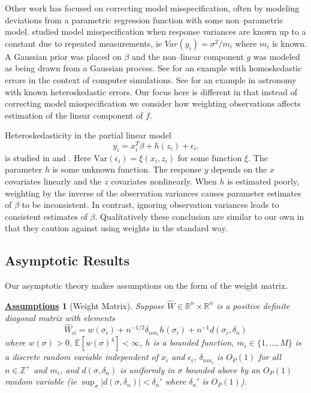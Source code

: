\documentclass[ejs,ps,preprint]{imsart}
\numberwithin{equation}{section}
\theoremstyle{plain}
\newcommand{\Var}{\text{Var}}
\newcommand{\E}{\mathbb{E}}
\newtheorem{Assume}{\underline{\bf Assumptions}}
\def\E{\mathbb{E}}
\begin{document}
Other work has focused on correcting model misspecification, often by modeling deviations from a parametric regression function with some non--parametric model. \cite{blight1975bayesian} studied model misspecification when response variances are known up to a constant due to repeated measurements, ie $Var(y_i) = \sigma^2/m_i$ where $m_i$ is known. A Gaussian prior was placed on $\beta$ and the non--linear component $g$ was modeled as being drawn from a Gaussian process. See \cite{kennedy2001bayesian} for an example with homoskedastic errors in the context of computer simulations. See \cite{czekala2015constructing} for an example in astronomy with known heteroskedastic errors. Our focus here is different in that instead of correcting model misspecification we consider how weighting observations affects estimation of the linear component of $f$. 

Heteroskedasticity in the partial linear model
\begin{equation*}
y_i = x_i^T\beta + h(z_i) + \epsilon_i.
\end{equation*}
is studied in \cite{ma2006efficient} and \cite{ma2013doubly}. Here $\Var(\epsilon_i) = \xi(x_i,z_i)$ for some function $\xi$. The parameter $h$ is some unknown function. The response $y$ depends on the $x$ covariates linearly and the $z$ covariates nonlinearly. When $h$ is estimated poorly, weighting by the inverse of the observation variances causes parameter estimates of $\beta$ to be inconsistent. In contrast, ignoring observation variances leads to consistent estimates of $\beta$.  Qualitatively these conclusion are similar to our own in that they caution against using weights in the standard way.



\subsection{Asymptotic Results}

Our asymptotic theory makes assumptions on the form of the weight matrix.
\begin{Assume}[Weight Matrix]
\label{ass:weight}
Suppose $\widehat{W} \in \mathbb{R}^n \times \mathbb{R}^n$ is a positive definite diagonal matrix with elements
\begin{equation*}
\widehat{W}_{ii} = w(\sigma_i) + n^{-1/2}\delta_{nm_i}h(\sigma_i) + n^{-1}d(\sigma_i,\delta_n)
\end{equation*}
where $w(\sigma) > 0$, $\E[w(\sigma)^4] < \infty$, $h$ is a bounded function, $m_i \in \{1,\ldots,M\}$ is a discrete random variable independent of $x_i$ and $\epsilon_i$, $\delta_{nm_i}$ is $O_P(1)$ for all $n \in \mathbb{Z}^+$ and $m_i$, and $d(\sigma,\delta_n)$ is uniformly in $\sigma$ bounded above by an $O_P(1)$ random variable (ie $\sup_{\sigma} |d(\sigma,\delta_n)| < \delta_n'$ where $\delta_n'$ is $O_P(1)$).
\end{Assume}
\end{document}
